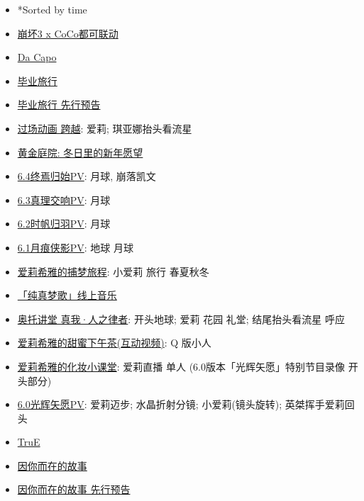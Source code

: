 \documentclass[a4paper]{article}
\begin{document}
\begin{itemize}
    \item *Sorted by time
    \item \href{https://www.bilibili.com/video/BV1j84y1D7uf/}{崩坏3 x CoCo都可联动}
    \item \href{https://www.bilibili.com/video/BV1aM4y1R77W/}{Da Capo}
    \item \href{https://www.bilibili.com/video/BV1Kj411g7Lu/}{毕业旅行}
    \item \href{https://www.bilibili.com/video/BV1BD4y1g7Yp/}{毕业旅行 先行预告}
    \item \href{https://www.bilibili.com/video/BV1784y1p7vM/}{过场动画 跨越}: 爱莉; 琪亚娜抬头看流星
    \item \href{https://www.bilibili.com/video/BV1oA411o7zD/}{黄金庭院: 冬日里的新年愿望}
    \item \href{https://www.bilibili.com/video/BV12g411H7sC/}{6.4终焉归始PV}: 月球, 崩落凯文
    \item \href{https://www.bilibili.com/video/BV12g411H7sC/}{6.3真理交响PV}: 月球
    \item \href{https://www.bilibili.com/video/BV1vY411f7qz/}{6.2时帆归羽PV}: 月球
    \item \href{https://www.bilibili.com/video/BV1dd4y1B7Xb/}{6.1月痕侠影PV}: 地球 月球
    \item \href{https://www.bilibili.com/video/BV1ZW4y1t7Zf/}{爱莉希雅的捕梦旅程}: 小爱莉 旅行 春夏秋冬
    \item \href{https://www.bilibili.com/bangumi/play/ep672059/}{「纯真梦歌」线上音乐}
    \item \href{https://www.bilibili.com/video/BV1q14y147EC/}{奥托讲堂 真我·人之律者}: 开头地球; 爱莉 花园 礼堂; 结尾抬头看流星 呼应
    \item \href{https://www.bilibili.com/video/BV1Ta411Z7KE/}{爱莉希雅的甜蜜下午茶(互动视频)}: Q 版小人
    \item \href{https://www.bilibili.com/video/BV12T411w7CN/}{爱莉希雅的化妆小课堂}: 爱莉直播 单人 (6.0版本「光辉矢愿」特别节目录像 开头部分)
    \item \href{https://www.bilibili.com/video/BV1Mg411k7U5/}{6.0光辉矢愿PV}: 爱莉迈步; 水晶折射分镜; 小爱莉(镜头旋转); 英桀挥手爱莉回头
    \item \href{https://www.bilibili.com/video/BV1sg411y7cZ/}{TruE}
    \item \href{https://www.bilibili.com/video/BV1fY4y1F7GL/}{因你而在的故事}
    \item \href{https://www.bilibili.com/video/BV1Ee4y1D7ci/}{因你而在的故事 先行预告}

\end{itemize}
\end{document}
